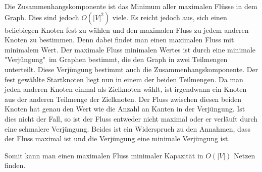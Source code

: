 \documentclass[a4paper,10pt]{article}
\begin{document}
Die Zusammenhangskomponente ist das Minimum aller maximalen Flüsse in dem Graph. Dies sind jedoch $O(|V|^2)$ viele.
Es reicht jedoch aus, sich einen beliebiegen Knoten fest zu wählen und den maximalen Fluss zu jedem anderen Knoten zu bestimmen. Denn dabei findet man einen maximalen Fluss mit minimalem Wert. Der maximale Fluss minimalen Wertes ist durch eine minimale "Verjüngung"\ im Graphen bestimmt, die den Graph in zwei Teilmengen unterteilt. Diese Verjüngung bestimmt auch die Zusammenhangskomponente. Der fest gewählte Startknoten liegt nun in einem der beiden Teilmengen. Da man jeden anderen Knoten einmal als Zielknoten wählt, ist irgendwann ein Knoten aus der anderen Teilmenge der Zielknoten. Der Fluss zwischen diesen beiden Knoten hat genau den Wert wie die Anzahl an Kanten in der Verjüngung. Ist dies nicht der Fall, so ist der Fluss entweder nicht maximal oder er verläuft durch eine schmalere Verjüngung. Beides ist ein Widerspruch zu den Annahmen, dass der Fluss maximal ist und die Verjüngung eine minimale Verjüngung ist.

Somit kann man einen maximalen Fluss minimaler Kapazität in $O(|V|)$ Netzen finden.
\end{document}
